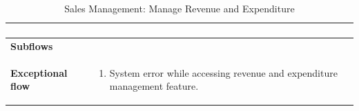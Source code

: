 \documentclass[../thesis.tex]{subfiles}
\begin{document}
\begin{center}
\begin{table}[H]
{\begin{tabular}[htbp]{|p{}|p{}|}
\begin{enumerate}
                                                   \end{enumerate} \\ \hline
                \textbf{Subflows              }  &                                                                                   \\ \hline
                \textbf{Exceptional flow       } & \begin{enumerate}
                                                       \item System error while accessing revenue and expenditure management feature.
                                                   \end{enumerate}      \\ \hline
            \end{tabular}%
        }
        \caption{Sales Management: Manage Revenue and Expenditure}
        \label{tab:table-usecase-manage-revenue-expenditure}
    \end{table}
\end{center}
\end{document}
